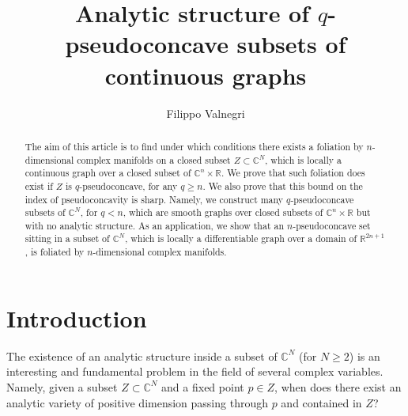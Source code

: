 \documentclass[reqno,oneside]{amsart}
\title{Analytic structure of $q$-pseudoconcave subsets of continuous graphs}
\author{Filippo Valnegri}
\date{}
\newcommand{\numberset}{\mathbb}
\newcommand{\R}{\numberset{R}}
\newcommand{\C}{\numberset{C}}
\theoremstyle{definition}
\theoremstyle{plain}
\theoremstyle{remark}
\begin{document}
	
\begin{abstract}
	The aim of this article is to find under which conditions there exists a foliation by $n$-dimensional complex manifolds on a closed subset $Z\subset\C^N$, which is locally a continuous graph over a closed subset of $\C^n\times\R$. We prove that such foliation does exist if $Z$ is $q$-pseudoconcave, for any $q\geq n$. We also prove that this bound on the index of pseudoconcavity is sharp. Namely, we construct many $q$-pseudoconcave subsets of $\C^N$, for $q<n$, which are smooth graphs over closed subsets of $\C^n\times\R$ but with no analytic structure. As an application, we show that an $n$-pseudoconcave set sitting in a subset of $\C^N$, which is locally a differentiable graph over a domain of $\R^{2n+1}$, is foliated by $n$-dimensional complex manifolds.
\end{abstract}


\maketitle



\section*{Introduction}
The existence of an analytic structure inside a subset of $\C^N$ (for $N\geq 2$) is an interesting and fundamental problem in the field of several complex variables. Namely, given a subset $Z\subset\C^N$ and a fixed point $p\in Z$, when does there exist an analytic variety of positive dimension passing through $p$ and contained in $Z$?
\end{document}
